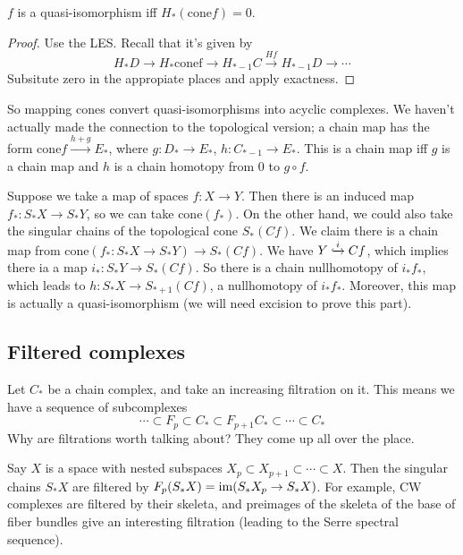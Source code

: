 \begin{lemma}
    $f$ is a quasi-isomorphism iff $H_*(\mathrm{cone}f)=0$.
\end{lemma}
\begin{proof}
    Use the LES. Recall that it's given by \[
    H_*D \to H_* \mathrm{cone f}\to H_{*-1}C \xrightarrow{Hf} H_{*-1}D \to \cdots 
    \] Subsitute zero in the appropiate places and apply exactness.
\end{proof}
So mapping cones convert quasi-isomorphisms into acyclic complexes. We haven't actually made the connection to the topological version; a chain map has the form $\mathrm{cone}f \xrightarrow{h+g}  E_*$, where $g \colon D_* \to E_*$, $ h \colon C_{*-1} \to E_*$. This is a chain map iff $g$ is a chain map and $h$ is a chain homotopy from 0 to $g \circ f$.
\begin{remark}
    Suppose we take a map of spaces $f \colon X \to Y$. Then there is an induced map $f_* \colon S_*X \to S_*Y$, so we can take $\mathrm{cone}(f_*)$. On the other hand, we could also take the singular chains of the topological cone $S_*(Cf)$. We claim there is a chain map from $\mathrm{cone}(f_* \colon S_*X \to S_*Y) \to S_*(Cf)$. We have $Y\lhook\joinrel\xrightarrow{i}Cf $, which implies there ia a map $i_* \colon S_*Y \to S_*(Cf)$. So there is a chain nullhomotopy of $i_* f_*$, which leads to $h \colon S_*X \to S_{*+1}(Cf)$, a nullhomotopy of $i_*f_*$. Moreover, this map is actually a quasi-isomorphism (we will need excision to prove this part).
\end{remark}

\subsection{Filtered complexes}
Let $C_*$ be a chain complex, and take an increasing filtration on it. This means we have a sequence of subcomplexes \[
\cdots \subset F_p \subset C_* \subset F_{p+1}C_* \subset \cdots \subset C_*
\] Why are filtrations worth talking about? They come up all over the place.
\begin{example}
    Say $X$ is a space with nested subspaces $X_p \subset X_{p+1}\subset \cdots \subset X$. Then the singular chains $S_*X$ are filtered by $F_p(S_*X)=\operatorname{im} (S_*X_p \to S_*X)$. For example, CW complexes are filtered by their skeleta, and preimages of the skeleta of the base of fiber bundles give an interesting filtration (leading to the Serre spectral sequence).
\end{example}


